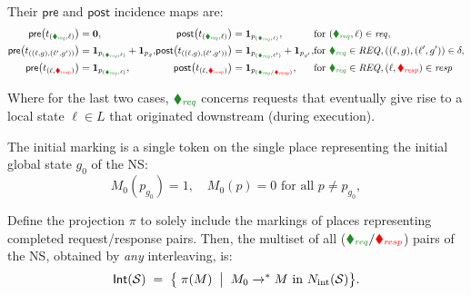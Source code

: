 Their \(\mathsf{pre}\) and \(\mathsf{post}\) incidence maps are:
\[
\begin{alignedat}{3}
	\mathsf{pre}\bigl(t_{({\color{ForestGreen}\blacklozenge_{\mathit{req}}},\ell)}\bigr)
	&= \mathbf0, &
	\mathsf{post}\bigl(t_{({\color{ForestGreen}\blacklozenge_{\mathit{req}}},\ell)}\bigr)
	&= \mathbf1_{p_{({\color{ForestGreen}\blacklozenge_{\mathit{req}}},\ell)}}, 
	&&\text{for }({\color{ForestGreen}\blacklozenge_{\mathit{req}}},\ell)\in\mathit{req},\\
	\mathsf{pre}\bigl(t_{((\ell,g),(\ell',g'))}\bigr)
	&= \mathbf1_{p_{({\color{ForestGreen}\blacklozenge_{\mathit{req}}},\ell)}} + \mathbf1_{p_g}, &
	\mathsf{post}\bigl(t_{((\ell,g),(\ell',g'))}\bigr)
	&= \mathbf1_{p_{({\color{ForestGreen}\blacklozenge_{\mathit{req}}},\ell')}} + \mathbf1_{p_{g'}}, 
	&&\text{for }{{\color{ForestGreen}\blacklozenge_{\mathit{req}}}\in\mathit{REQ}}, ((\ell,g),(\ell',g'))\in\delta,\\
	\mathsf{pre}\bigl(t_{(\ell,{\color{red}\blacklozenge_{\mathit{resp}}})}\bigr)
	&= \mathbf1_{p_{({\color{ForestGreen}\blacklozenge_{\mathit{req}}},\ell)}}, &
	\mathsf{post}\bigl(t_{(\ell,{\color{red}\blacklozenge_{\mathit{resp}}})}\bigr)
	&= \mathbf1_{p_{({\color{ForestGreen}\blacklozenge_{\mathit{req}}}/{\color{red}\blacklozenge_{\mathit{resp}}})}}, 
	&&\text{for }{{\color{ForestGreen}\blacklozenge_{\mathit{req}}}\in\mathit{REQ},(\ell,\color{red}\blacklozenge_{\mathit{resp}}})\in\mathit{resp}
\end{alignedat}
\]

Where for the last two cases, \({\color{ForestGreen}\blacklozenge_{\mathit{req}}}\) concerns requests that eventually give rise to a local state \(\ell \in L\) that originated downstream (during execution).

\medskip
The initial marking is a single token on the single place representing the initial global state $g_0$ of the NS:
\[
M_0(p_{g_0}) = 1,
\quad
M_0(p) = 0 \text{ for all }p\neq p_{g_0},
\]



Define the projection \(\pi\) to solely include the markings of places representing completed request/response pairs.
Then, the multiset of all  (${{\color{ForestGreen}\blacklozenge_{\mathit{req}}}/{\color{red}\blacklozenge_{\mathit{resp}}}}$) pairs of the NS, obtained by \textit{any} interleaving, is:
\[
\mathsf{Int}(\mathcal S)
\;=\;
\bigl\{\;\pi(M)\;\bigm|\;M_0 \xrightarrow{}^{*} M\text{ in }N_{\mathrm{int}}(\mathcal S)\bigr\}.
\]